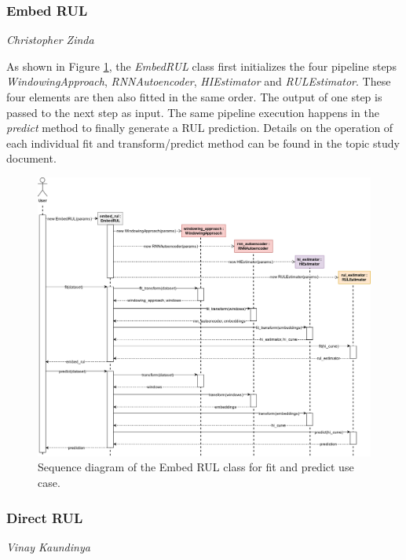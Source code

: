 \subsubsection*{Embed RUL}
\vspace*{-12.5mm}\hfill{\normalsize\emph{Christopher Zinda}}

As shown in Figure \ref{fig:rul_seq_embed_rul}, the \textit{EmbedRUL} class first initializes the four pipeline steps \textit{WindowingApproach}, \textit{RNNAutoencoder}, \textit{HIEstimator} and \textit{RULEstimator}. These four elements are then also fitted in the same order. The output of one step is passed to the next step as input. The same pipeline execution happens in the \textit{predict} method to finally generate a RUL prediction. Details on the operation of each individual fit and transform/predict method can be found in the topic study document.
\begin{figure}[H]
    \centering
    \includegraphics[width=\textwidth]{gfx/rul_seq_embed_rul}
    \caption{Sequence diagram of the Embed RUL class for fit and predict use case.}
    \label{fig:rul_seq_embed_rul}
\end{figure}

\subsubsection{Direct RUL}
\vspace*{-12.5mm}\hfill{\normalsize\emph{Vinay Kaundinya}}

